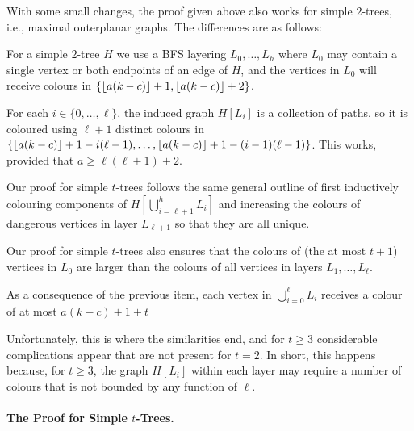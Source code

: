 \documentclass[kpfonts]{patmorin}
\theoremstyle{named}
\begin{document}
\begin{compactitem}
  \item With some small changes, the proof given above also works for simple $2$-trees, i.e., maximal outerplanar graphs.  The differences are as follows:
  \begin{compactitem}
      \item For a simple $2$-tree $H$ we use a BFS layering $L_0,\ldots,L_h$ where $L_0$ may contain a single vertex or both endpoints of an edge of $H$, and the  vertices in $L_0$ will receive colours in $\{{\lfloor a(k-c) \rfloor}+1,{\lfloor a(k-c) \rfloor}+2\}$.
      \item For each $i\in\{0,\ldots,\ell\}$, the induced graph $H[L_i]$ is a collection of paths, so it is coloured using $\ell+1$ distinct colours in $\{{\lfloor a(k-c) \rfloor}+1-i(\ell-1),\ldots,{\lfloor a(k-c) \rfloor}+1-(i-1)(\ell-1)\}$.  This works, provided that $a\ge\ell(\ell+1) + 2$.
  \end{compactitem}

  \item Our proof for simple $t$-trees follows the same general outline of first inductively colouring components of $H[\bigcup_{i=\ell+1}^{h} L_i]$ and increasing the colours of dangerous vertices in layer $L_{\ell+1}$ so that they are all unique.

  \item Our proof for simple $t$-trees also ensures that the colours of (the at most $t+1$) vertices in $L_0$ are larger than the colours of all vertices in layers $L_1,\ldots,L_\ell$.

  \item As a consequence of the previous item, each vertex in $\bigcup_{i=0}^\ell L_i$ receives a colour of at most $a(k-c)+1+t$
\end{compactitem}

Unfortunately, this is where the similarities end, and for $t\ge 3$ considerable complications appear that are not present for $t=2$. In short, this happens because, for $t\ge 3$, the graph $H[L_i]$ within each layer may require a number of colours that is not bounded by any function of $\ell$.

\paragraph{The Proof for Simple $t$-Trees.}
\end{document}
